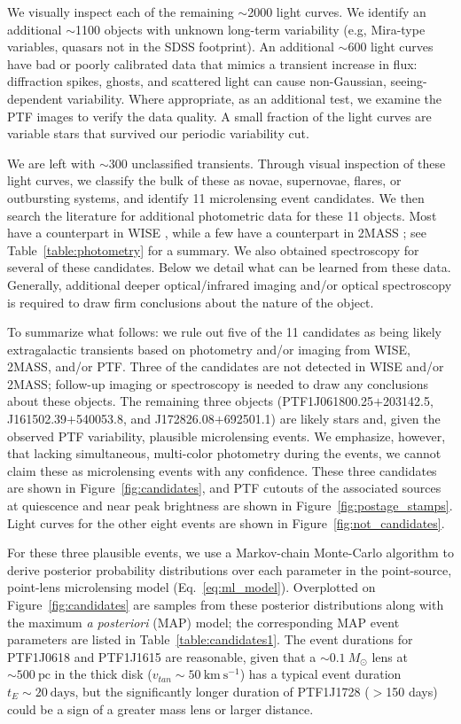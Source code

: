 \documentclass{emulateapj}
\begin{document}
We visually inspect each of the remaining $\sim$2000 light curves. We identify an additional $\sim$1100 objects with unknown long-term variability (e.g, Mira-type variables, quasars not in the SDSS footprint). An additional $\sim$600 light curves have bad or poorly calibrated data that mimics a transient increase in flux: diffraction spikes, ghosts, and scattered light can cause non-Gaussian, seeing-dependent variability. Where appropriate, as an additional test, we examine the PTF images to verify the data quality. A small fraction of the light curves are variable stars that survived our periodic variability cut. 

We are left with $\sim$300 unclassified transients. Through visual inspection of these light curves, we classify the bulk of these as novae, supernovae, flares, or outbursting systems, and identify 11 microlensing event candidates. We then search the literature for additional photometric data for these 11 objects. Most have a counterpart in WISE \citep{WISE}, while a few have a counterpart in 2MASS \citep{cutri03}; see Table~\ref{table:photometry} for a summary. We also obtained spectroscopy for several of these candidates. Below we detail what can be learned from these data. Generally, additional deeper optical/infrared imaging and/or optical spectroscopy is required to draw firm conclusions about the nature of the object.

To summarize what follows: we rule out five of the 11 candidates as being likely extragalactic transients based on photometry and/or imaging from WISE, 2MASS, and/or PTF. Three of the candidates are not detected in WISE and/or 2MASS; follow-up imaging or spectroscopy is needed to draw any conclusions about these objects. The remaining three objects (PTF1J061800.25$+$203142.5, J161502.39$+$540053.8, and J172826.08$+$692501.1) are likely stars and, given the observed PTF variability, plausible microlensing events. We emphasize, however, that lacking simultaneous, multi-color photometry during the events, we cannot claim these as microlensing events with any confidence. These three candidates are shown in Figure~\ref{fig:candidates}, and PTF cutouts of the associated sources at quiescence and near peak brightness are shown in Figure~\ref{fig:postage_stamps}. Light curves for the other eight events are shown in Figure~\ref{fig:not_candidates}.

For these three plausible events, we use a Markov-chain Monte-Carlo algorithm \citep{goodman, dfm} to derive posterior probability distributions over each parameter in the point-source, point-lens microlensing model (Eq.~\ref{eq:ml_model}). Overplotted on Figure~\ref{fig:candidates} are samples from these posterior distributions along with the maximum {\it a posteriori} (MAP) model; the corresponding MAP event parameters are listed in Table~\ref{table:candidates1}. The event durations for PTF1J0618 and PTF1J1615 are reasonable, given that a ${\sim}0.1\ M_\odot$ lens at ${\sim}500~\mathrm{pc}$ in the thick disk ($v_{tan}\sim 50~\mathrm{km}~\mathrm{s}^{-1}$) has a typical event duration $t_E \sim 20~\mathrm{days}$, but the significantly longer duration of PTF1J1728 ($>$150 days) could be a sign of a greater mass lens or larger distance.
\end{document}

